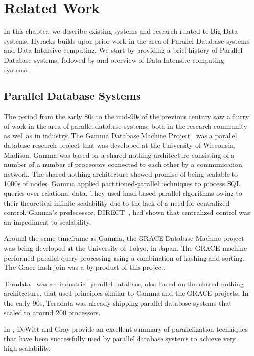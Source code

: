 \chapter{Related Work}
\label{ch:foundations}

In this chapter, we describe existing systems and research related to Big Data systems. Hyracks builds upon prior work in the area of Parallel Database systems and Data-Intensive computing. We start by providing a brief history of Parallel Database systems, followed by and overview of Data-Intensive computing systems.

\section{Parallel Database Systems}

The period from the early 80s to the mid-90s of the previous century saw a flurry of work in the area of parallel database systems, both in the research community as well as in industry. The Gamma Database Machine Project~\cite{GammaVLDB,GammaTKDE} was a parallel database research project that was developed at the University of Wisconsin, Madison. Gamma was based on a shared-nothing architecture consisting of a number of a number of processors connected to each other by a communication network. The shared-nothing architecture showed promise of being scalable to 1000s of nodes. Gamma applied partitioned-parallel techniques to process SQL queries over relational data. They used hash-based parallel algorithms owing to their theoretical infinite scalability due to the lack of a need for centralized control. Gamma's predecessor, DIRECT~\cite{DBLP:journals/tse/BoralDFJW82}, had shown that centralized control was an impediment to scalability.

Around the same timeframe as Gamma, the GRACE Database Machine project~\cite{GRACE} was being developed at the University of Tokyo, in Japan. The GRACE machine performed parallel query processing using a combination of hashing and sorting. The Grace hash join was a by-product of this project.

Teradata~\cite{Teradata} was an industrial parallel database, also based on the shared-nothing architecture, that used principles similar to Gamma and the GRACE projects. In the early 90s, Teradata was already shipping parallel database systems that scaled to around 200 processors.

In \cite{DewittGrayPDB}, DeWitt and Gray provide an excellent summary of parallelization techniques that have been successfully used by parallel database systems to achieve very high scalability.

